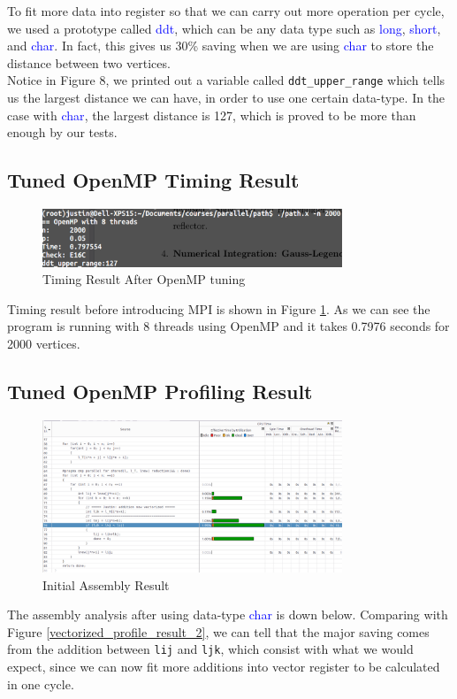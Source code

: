 To fit more data into register so that we can carry out more operation per cycle, we used
a prototype called \textcolor{blue}{ddt}, which can be any data type such as \textcolor{blue}{long},
\textcolor{blue}{short}, and \textcolor{blue}{char}. In fact, this gives us 30\% saving when we are
using \textcolor{blue}{char} to store the distance between two vertices. \\

Notice in Figure 8, we printed out a variable called \texttt{ddt\_upper\_range} which tells us the largest
distance we can have, in order to use one certain data-type. In the case with \textcolor{blue}{char}, the
largest distance is 127, which is proved to be more than enough by our tests.


\subsection{Tuned OpenMP Timing Result}

\begin{figure}[H]
    \centering
    \includegraphics[width=0.8\textwidth]{figs/2_timing.png}
    \caption{Timing Result After OpenMP tuning}
    \label{ddt_profile_result_2}
\end{figure}

Timing result before introducing MPI is shown in Figure \ref{ddt_profile_result_2}.
As we can see the program is running with 8 threads using OpenMP and it takes 0.7976
seconds for 2000 vertices.

\subsection{Tuned OpenMP Profiling Result}

\begin{figure}[H]
    \centering
    \includegraphics[width=0.8\textwidth]{figs/2_assembly.png}
    \caption{Initial Assembly Result}
    \label{ddt_profile_result_1}
\end{figure}

The assembly analysis after using data-type \textcolor{blue}{char} is down below. Comparing with Figure
\ref{vectorized_profile_result_2}, we can tell that the major saving comes from the addition between 
\texttt{lij} and \texttt{ljk}, which consist with what we would expect, since we can now fit more additions
into vector register to be calculated in one cycle.

